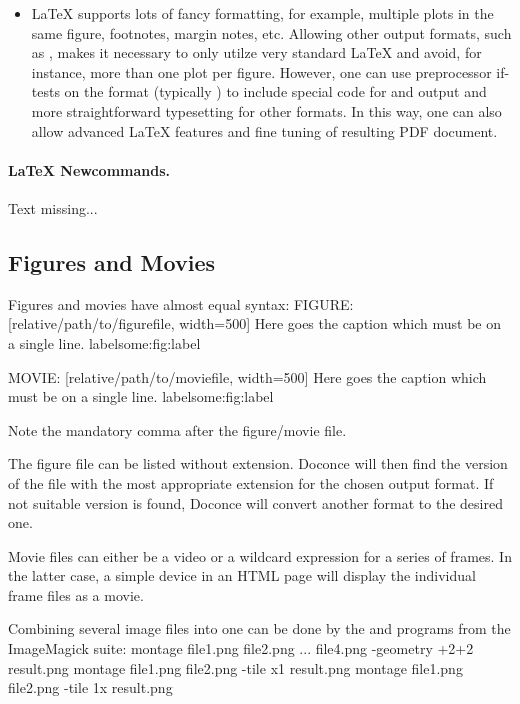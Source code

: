 \documentclass[twoside]{book}
\begin{document}
{\begin{itemize}
  \item {\LaTeX} supports lots of fancy formatting, for example, multiple
    plots in the same figure, footnotes, margin notes, etc.
    Allowing other output formats, such as , makes it necessary
    to only utilze very standard {\LaTeX} and avoid, for instance, more than
    one plot per figure. However, one can use preprocessor if-tests on
    the format (typically ) to
    include special code for  and  output and more
    straightforward typesetting for other formats. In this way, one can
    also allow advanced {\LaTeX} features and fine tuning of resulting
    PDF document.
\end{itemize}

\noindent
\paragraph{LaTeX Newcommands.}
Text missing...

\subsection{Figures and Movies}

Figures and movies have almost equal syntax:
\bccq
FIGURE: [relative/path/to/figurefile, width=500] Here goes the caption which must be on a single line. label{some:fig:label}

MOVIE: [relative/path/to/moviefile, width=500] Here goes the caption which must be on a single line. label{some:fig:label}

\eccq
Note the mandatory comma after the figure/movie file.

The figure file can be listed without extension. Doconce will then find
the version of the file with the most appropriate extension for the chosen
output format. If not suitable version is found, Doconce will convert
another format to the desired one.

Movie files can either be a video or a wildcard expression for a
series of frames. In the latter case, a simple device in an HTML page
will display the individual frame files as a movie.

Combining several image files into one can be done by the
 and  programs from the ImageMagick suite:
\bsys
montage file1.png file2.png ... file4.png -geometry +2+2  result.png
montage file1.png file2.png -tile x1 result.png
montage file1.png file2.png -tile 1x result.png

}
\end{document}

